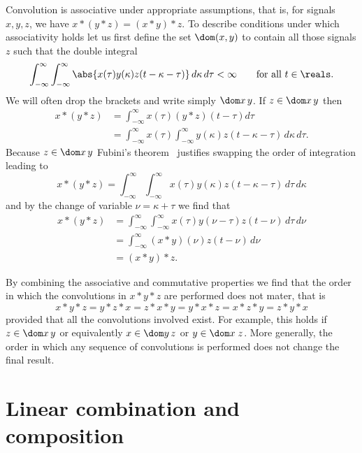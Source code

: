 Convolution is associative under appropriate assumptions, that is, for signals $x,y,z$, we have $x*(y*z) = (x*y)*z$.  To describe conditions under which associativity holds let us first define the set $\dom(x,y)$ to contain all those signals $z$ such that the double integral
\[
\int_{-\infty}^\infty \int_{-\infty}^\infty  \abs{x(\tau)y(\kappa)z(t - \kappa - \tau)} \, d\kappa \, d\tau < \infty \qquad \text{for all $t \in \reals$}.
\] 
We will often drop the brackets and write simply $\dom x\,y$.  If $z \in \dom x\,y$ then 
\begin{align*}
x*(y*z) &= \int_{-\infty}^\infty x(\tau) (y*z)(t - \tau) d\tau \\
&= \int_{-\infty}^\infty  x(\tau) \int_{-\infty}^\infty y(\kappa) z(t - \kappa - \tau) \, d\kappa \, d\tau.
\end{align*}
Because $z \in \dom x\,y$ Fubini's theorem~\cite[Theorem~8.8]{Rudin_real_and_complex_analysis} justifies swapping the order of integration leading to
\[
x*(y*z) = \int_{-\infty}^\infty  \int_{-\infty}^\infty x(\tau) y(\kappa) z(t - \kappa - \tau) \, d\tau \, d\kappa 
\]
and by the change of variable $\nu = \kappa + \tau$ we find that
\begin{align*}
x*(y*z) &= \int_{-\infty}^\infty  \int_{-\infty}^\infty x(\tau) y(\nu - \tau)  z(t - \nu) \, d\tau \, d\nu \\
&= \int_{-\infty}^\infty  (x*y)(\nu)  z(t - \nu)  \, d\nu \\
&= (x*y)*z.
\end{align*}

By combining the associative and commutative properties we find that the order in which the convolutions in $x * y * z$ are performed does not mater, that is
\[
x*y*z = y*z*x = z*x*y = y*x*z = x*z*y = z*y*x
\]
provided that all the convolutions involved exist.  For example, this holds if $z \in \dom x\,y$ or equivalently $x \in \dom y\,z$ or $y \in \dom x\;z$.  More generally, the order in which any sequence of convolutions is performed does not change the final result.

\section{Linear combination and composition}\label{sec:line-comb-comp}


